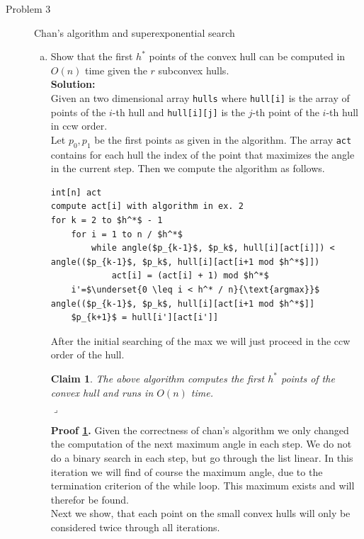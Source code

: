 \documentclass[11pt,a4paper,ngerman]{article}
\newtheorem{lemma}{\bfseries Claim}
\begin{document}
\begin{description}
\item[Problem 3] Chan's algorithm and superexponential search
  \begin{enumerate}[a)]
    \item Show that the first $h^*$ points of the convex hull
        can be computed in $O(n)$ time given the $r$ subconvex hulls.\\
    \textbf{Solution:}\\
        Given an two dimensional array \lstinline|hulls| where
        \lstinline|hull[i]| is the array of points of the $i$-th hull
        and \lstinline|hull[i][j]| is the $j$-th point of the $i$-th hull
        in ccw order.\\
        Let $p_0, p_1$ be the first points as given in the algorithm. 
        The array \lstinline|act| contains for each hull the index
        of the point that maximizes the angle in the current step. Then
        we compute the algorithm as follows.
\begin{lstlisting}[mathescape=true]
int[n] act
compute act[i] with algorithm in ex. 2
for k = 2 to $h^*$ - 1 
    for i = 1 to n / $h^*$
        while angle($p_{k-1}$, $p_k$, hull[i][act[i]]) < angle(($p_{k-1}$, $p_k$, hull[i][act[i+1 mod $h^*$]])
            act[i] = (act[i] + 1) mod $h^*$
    i'=$\underset{0 \leq i < h^* / n}{\text{argmax}}$ angle(($p_{k-1}$, $p_k$, hull[i][act[i+1 mod $h^*$]]
    $p_{k+1}$ = hull[i'][act[i']]
\end{lstlisting}

    After the initial searching of the max we will just proceed in the ccw order of the
    hull.
    \begin{lemma}\label{alge:ueb2:p3}
        The above algorithm computes the first $h^*$ points of the convex hull
        and runs in $O(n)$ time.\\
        \mbox{}\hfill$\lrcorner$
    \end{lemma}

    \textbf{Proof \ref{alge:ueb2:p3}.}
        Given the correctness of chan's algorithm we only changed the computation
        of the next maximum angle in each step. We do not do a binary search
        in each step, but go through the list linear. In this iteration we
        will find of course the maximum angle, due to the termination criterion of
        the while loop. This maximum exists and will therefor be found.\\

        Next we show, that each point on the small convex hulls will only be
        considered twice through all iterations.\\


\end{enumerate}
\end{description}
\end{document}
